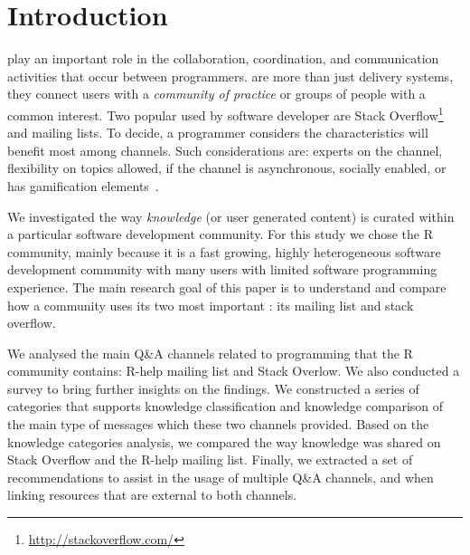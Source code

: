 \section{Introduction}
\label{cha:introduction}

    \Channels play an important role in the collaboration, coordination, and communication activities that occur between programmers.
    \Channels are more than just delivery systems, they connect users with a \textit{community of practice} or groups of people with a common interest.
    Two popular \channels used by software developer are Stack Overflow\footnote{\url{http://stackoverflow.com/}} and mailing lists.
    To decide, a programmer considers the characteristics will benefit most among channels.
    Such considerations are: experts on the channel, flexibility on topics allowed, if the channel is asynchronous, socially enabled, or has gamification elements~\cite{Vasilescu2014c}.

    We investigated the way \textit{knowledge} (or user generated content) is curated within a particular software development community.
    For this study we chose the R community, mainly because it is a fast growing, highly heterogeneous software development community with many users with
    limited software programming experience.
    The main research goal of this paper is to understand and compare how a community uses its two most important \channels: its mailing list and
    stack overflow. 

    We analysed the main Q\&A channels related to programming that the R community contains: R-help mailing list and Stack Overlow.
    We also conducted a survey to bring further insights on the findings.
    We constructed a series of categories that supports knowledge classification and knowledge comparison of the main type of messages which these two channels provided.
    Based on the knowledge categories analysis, we compared the way knowledge was shared on Stack Overflow and the R-help mailing list.
    Finally, we extracted a set of recommendations to assist in the usage of multiple Q\&A channels, and when linking resources that are external to both channels.

